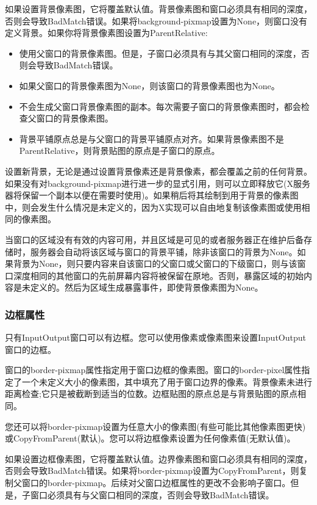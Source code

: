 如果设置背景像素图，它将覆盖默认值。背景像素图和窗口必须具有相同的深度，否则会导致BadMatch错误。如果将background-pixmap设置为None，则窗口没有定义背景。如果你将背景像素图设置为ParentRelative:

\begin{itemize}
	\item 使用父窗口的背景像素图。但是，子窗口必须具有与其父窗口相同的深度，否则会导致BadMatch错误。
	\item 如果父窗口的背景像素图为None，则该窗口的背景像素图也为None。
	\item 不会生成父窗口背景像素图的副本。每次需要子窗口的背景像素图时，都会检查父窗口的背景像素图。
	\item 背景平铺原点总是与父窗口的背景平铺原点对齐。如果背景像素图不是ParentRelative，则背景贴图的原点是子窗口的原点。
\end{itemize}

设置新背景，无论是通过设置背景像素还是背景像素，都会覆盖之前的任何背景。如果没有对background-pixmap进行进一步的显式引用，则可以立即释放它(X服务器将保留一个副本以便在需要时使用)。如果稍后将其绘制到用于背景的像素图中，则会发生什么情况是未定义的，因为X实现可以自由地复制该像素图或使用相同的像素图。

当窗口的区域没有有效的内容可用，并且区域是可见的或者服务器正在维护后备存储时，服务器会自动将该区域与窗口的背景平铺，除非该窗口的背景为None。如果背景为None，则只要内容来自该窗口的父窗口或父窗口的下级窗口，则与该窗口深度相同的其他窗口的先前屏幕内容将被保留在原地。否则，暴露区域的初始内容是未定义的。然后为区域生成暴露事件，即使背景像素图为None。

\subsubsection{边框属性}

只有InputOutput窗口可以有边框。您可以使用像素或像素图来设置InputOutput窗口的边框。

窗口的border-pixmap属性指定用于窗口边框的像素图。窗口的border-pixel属性指定了一个未定义大小的像素图，其中填充了用于窗口边界的像素。背景像素未进行距离检查;它只是被截断到适当的位数。边框贴图的原点总是与背景贴图的原点相同。

您还可以将border-pixmap设置为任意大小的像素图(有些可能比其他像素图更快)或CopyFromParent(默认)。您可以将边框像素设置为任何像素值(无默认值)。

如果设置边框像素图，它将覆盖默认值。边界像素图和窗口必须具有相同的深度，否则会导致BadMatch错误。如果将border-pixmap设置为CopyFromParent，则复制父窗口的border-pixmap。后续对父窗口边框属性的更改不会影响子窗口。但是，子窗口必须具有与父窗口相同的深度，否则会导致BadMatch错误。

